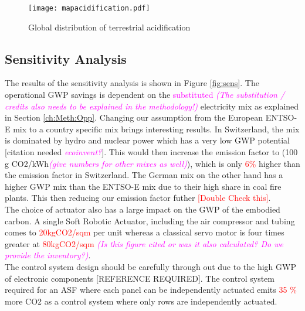 \begin{figure}[H]
\begin{center}
\texttt{[image: mapacidification.pdf]}
\caption{Global distribution of terrestrial acidification}
\label{fig:mapAcid}
\end{center}
\end{figure}


\subsection{Sensitivity Analysis}

The results of the sensitivity analysis is shown in Figure \ref{fig:sens}. The operational GWP savings is dependent on the \textcolor{magenta}{substituted \textit{(The substitution / credits also needs to be explained in the methodology!)}} electricity mix as explained in Section \ref{ch:Meth:Opp}. Changing our assumption from the European ENTSO-E mix to a country specific mix brings interesting results. In Switzerland, the mix is dominated by hydro and nuclear power which has a very low GWP potential [citation needed \textcolor{magenta}{ \textit{ecoinvent?}}]. This would then increase the emission factor to (100 g CO2/kWh\textcolor{magenta}{\textit{(give numbers for other mixes as well)}}), which is only \textcolor{red}{6\%} higher than the emission factor in Switzerland. The German mix on the other hand has a higher GWP mix than the ENTSO-E mix due to their high share in coal fire plants. This then reducing our emission factor futher \textcolor{red}{[Double Check this]}.\\

The choice of actuator also has a large impact on the GWP of the embodied carbon. A single Soft Robotic Actuator, including the air compressor and tubing comes to \textcolor{red}{20kgCO2/sqm} per unit whereas a classical servo motor is four times greater at \textcolor{red}{80kgCO2/sqm} \textcolor{magenta}{\textit{(Is this figure cited or was it also calculated? Do we provide the inventory?)}}.\\

The control system design should be carefully through out due to the high GWP of electronic components [REFERENCE REQUIRED]. The control system required for an ASF where each panel can be independently actuated emits \textcolor{red}{35 \%} more CO2 as a control system where only rows are independently actuated.\\

